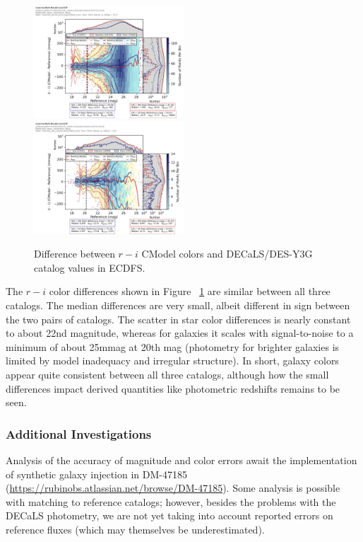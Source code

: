 \begin{figure}
  \includegraphics[width=0.5\textwidth]{galaxy_photometry/cdfs_g_vs_rmi_DECaLS.png}
  \includegraphics[width=0.5\textwidth]{galaxy_photometry/cdfs_g_vs_rmi_desy3g.png}
\caption{Difference between $r-i$ CModel colors and DECaLS/DES-Y3G catalog values in ECDFS.}
  \label{fig:cdfs_rmi_vs_des}
\end{figure}

The $r-i$ color differences shown in Figure ~\ref{fig:cdfs_rmi_vs_des} are similar between all three catalogs.
The median differences are very small, albeit different in sign between the two pairs of catalogs.
The scatter in star color differences is nearly constant to about 22nd magnitude, whereas for galaxies it scales with signal-to-noise to a minimum of about 25mmag at 20th mag (photometry for brighter galaxies is limited by model inadequacy and irregular structure).
In short, galaxy colors appear quite consistent between all three catalogs, although how the small differences impact derived quantities like photometric redshifts remains to be seen.

\subsubsection{Additional Investigations}
\label{subsec:galaxy_photometry_additional}

Analysis of the accuracy of magnitude and color errors await the implementation of synthetic galaxy injection in DM-47185 (\url{https://rubinobs.atlassian.net/browse/DM-47185}).
Some analysis is possible with matching to reference catalogs; however, besides the problems with the DECaLS photometry, we are not yet taking into account reported errors on reference fluxes (which may themselves be underestimated).

